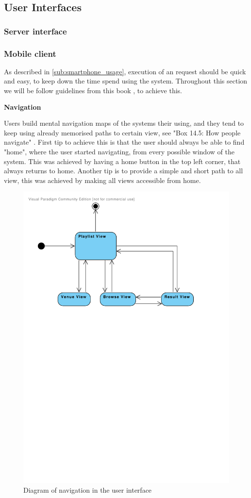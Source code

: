 \subsection{User Interfaces}

\subsubsection{Server interface}

\subsubsection{Mobile client}

As described in \cref{sub:smartphone_usage}, execution of an request should be quick and easy, to keep down the time spend using the system. Throughout this section we will be follow guidelines from this book \cite{DEB}, to achieve this.

\textbf{Navigation}

Users build mental navigation maps of the systems their using, and they tend to keep using already memorised paths to certain view, see "Box 14.5: How people navigate" \cite{DEB}.
First tip to achieve this is that the user should always be able to find "home", where the user started navigating, from every possible window of the system. This was achieved by having a home button in the top left corner, that always returns to home.
Another tip is to provide a simple and short path to all view, this was achieved by making all views accessible from home. 

\begin{figure}
  \centering
  \includegraphics[width=0.5\linewidth]{Images/UserInterface.pdf}
  \caption{Diagram of navigation in the user interface}
  \label{fig:UserInterface}
\end{figure}

